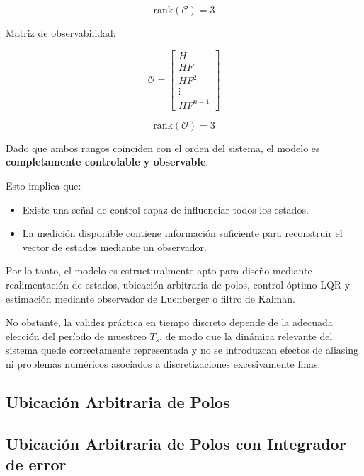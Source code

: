 \[
\text{rank}(\mathcal{C}) = 3
\]

Matriz de observabilidad:

\[
\mathcal{O}=
\begin{bmatrix}
	H \\
	HF \\
	HF^2 \\
	\vdots \\
	HF^{n-1}
\end{bmatrix}
\]

\[
\text{rank}(\mathcal{O}) = 3
\]

Dado que ambos rangos coinciden con el orden del sistema,
el modelo es \textbf{completamente controlable y observable}.

Esto implica que:

\begin{itemize}
	\item Existe una señal de control capaz de influenciar todos los estados.
	\item La medición disponible contiene información suficiente
	para reconstruir el vector de estados mediante un observador.
\end{itemize}

Por lo tanto, el modelo es estructuralmente apto
para diseño mediante realimentación de estados,
ubicación arbitraria de polos,
control óptimo LQR
y estimación mediante observador de Luenberger
o filtro de Kalman.

No obstante,
la validez práctica en tiempo discreto
depende de la adecuada elección del período de muestreo \(T_s\),
de modo que la dinámica relevante del sistema
quede correctamente representada
y no se introduzcan efectos de aliasing
ni problemas numéricos asociados
a discretizaciones excesivamente finas.

\subsection{Ubicación Arbitraria de Polos}


\balance
\clearpage
\subsection{Ubicación Arbitraria de Polos con Integrador de error}

